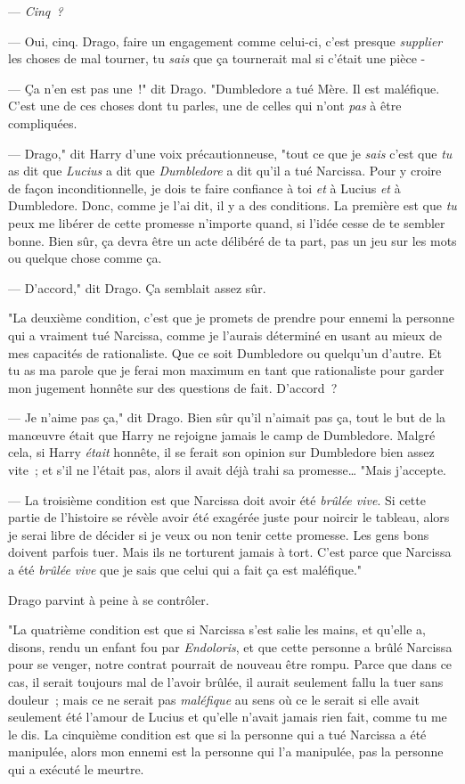 --- \emph{Cinq~?}

--- Oui, cinq. Drago, faire un engagement comme celui-ci, c'est presque \emph{supplier} les choses de mal tourner, tu \emph{sais} que ça tournerait mal si c'était une pièce -

--- Ça n'en est pas une~!" dit Drago. "Dumbledore a tué Mère. Il est maléfique. C'est une de ces choses dont tu parles, une de celles qui n'ont \emph{pas} à être compliquées.

--- Drago," dit Harry d'une voix précautionneuse, "tout ce que je \emph{sais} c'est que \emph{tu} as dit que \emph{Lucius} a dit que \emph{Dumbledore} a dit qu'il a tué Narcissa. Pour y croire de façon inconditionnelle, je dois te faire confiance à toi \emph{et} à Lucius \emph{et} à Dumbledore. Donc, comme je l'ai dit, il y a des conditions. La première est que \emph{tu} peux me libérer de cette promesse n'importe quand, si l'idée cesse de te sembler bonne. Bien sûr, ça devra être un acte délibéré de ta part, pas un jeu sur les mots ou quelque chose comme ça.

--- D'accord," dit Drago. Ça semblait assez sûr.

"La deuxième condition, c'est que je promets de prendre pour ennemi la personne qui a vraiment tué Narcissa, comme je l'aurais déterminé en usant au mieux de mes capacités de rationaliste. Que ce soit Dumbledore ou quelqu'un d'autre. Et tu as ma parole que je ferai mon maximum en tant que rationaliste pour garder mon jugement honnête sur des questions de fait. D'accord~?

--- Je n'aime pas ça," dit Drago. Bien sûr qu'il n'aimait pas ça, tout le but de la manœuvre était que Harry ne rejoigne jamais le camp de Dumbledore. Malgré cela, si Harry \emph{était} honnête, il se ferait son opinion sur Dumbledore bien assez vite~; et s'il ne l'était pas, alors il avait déjà trahi sa promesse… "Mais j'accepte.

--- La troisième condition est que Narcissa doit avoir été \emph{brûlée vive}. Si cette partie de l'histoire se révèle avoir été exagérée juste pour noircir le tableau, alors je serai libre de décider si je veux ou non tenir cette promesse. Les gens bons doivent parfois tuer. Mais ils ne torturent jamais à tort. C'est parce que Narcissa a été \emph{brûlée vive} que je sais que celui qui a fait ça est maléfique."

Drago parvint à peine à se contrôler.

"La quatrième condition est que si Narcissa s'est salie les mains, et qu'elle a, disons, rendu un enfant fou par \emph{Endoloris}, et que cette personne a brûlé Narcissa pour se venger, notre contrat pourrait de nouveau être rompu. Parce que dans ce cas, il serait toujours mal de l'avoir brûlée, il aurait seulement fallu la tuer sans douleur~; mais ce ne serait pas \emph{maléfique} au sens où ce le serait si elle avait seulement été l'amour de Lucius et qu'elle n'avait jamais rien fait, comme tu me le dis. La cinquième condition est que si la personne qui a tué Narcissa a été manipulée, alors mon ennemi est la personne qui l'a manipulée, pas la personne qui a exécuté le meurtre.

